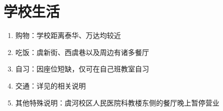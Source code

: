 \section[学校生活]{学校生活}
\begin{enumerate}
    \item 购物：学校距离泰华、万达均较近
    \item 吃饭：虞新街、西虞巷以及周边有诸多餐厅
    \item 自习：因座位短缺，仅可在自己班教室自习
    \item 交通：详见的相关说明
    \item 其他特殊说明：虞河校区人民医院科教楼东侧的餐厅晚上暂停营业
\end{enumerate}

